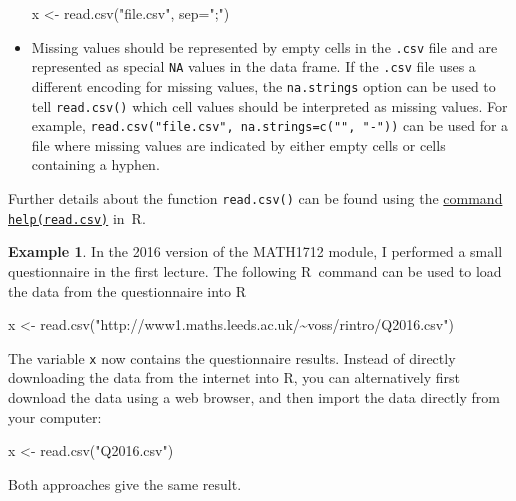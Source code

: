 \documentclass[
  a4paper,
]{article}
\newenvironment{Shaded}{\begin{snugshade}}{\end{snugshade}}
\newcommand{\AttributeTok}[1]{\textcolor[rgb]{0.77,0.63,0.00}{#1}}
\newcommand{\FunctionTok}[1]{\textcolor[rgb]{0.00,0.00,0.00}{#1}}
\newcommand{\NormalTok}[1]{#1}
\newcommand{\OtherTok}[1]{\textcolor[rgb]{0.56,0.35,0.01}{#1}}
\newcommand{\StringTok}[1]{\textcolor[rgb]{0.31,0.60,0.02}{#1}}
\theoremstyle{definition}
\theoremstyle{definition}
\newtheorem{example}{Example}[section]
\theoremstyle{definition}
\theoremstyle{definition}
\theoremstyle{remark}
\begin{document}
\begin{itemize}
\begin{Shaded}
\begin{Highlighting}[]
\NormalTok{  x }\OtherTok{\textless{}{-}} \FunctionTok{read.csv}\NormalTok{(}\StringTok{"file.csv"}\NormalTok{, }\AttributeTok{sep=}\StringTok{";"}\NormalTok{)}
\end{Highlighting}
\end{Shaded}
\item
  Missing values should be represented by empty cells in the \texttt{.csv}
  file and are represented as special \texttt{NA} values in the data frame.
  If the \texttt{.csv} file uses a different encoding for missing values,
  the \texttt{na.strings} option can be used to tell \texttt{read.csv()}
  which cell values should be interpreted as missing values. For example,
  \texttt{read.csv("file.csv",\ na.strings=c("",\ "-"))} can be used for a file
  where missing values are indicated by either empty cells or cells
  containing a hyphen.
\end{itemize}

Further details about the function \texttt{read.csv()} can be found using the
\href{https://rdrr.io/r/utils/read.table.html}{command \texttt{help(read.csv)}} in~R.

\begin{example}
\protect\hypertarget{exm:l1-poll-import}{}\label{exm:l1-poll-import}In the 2016 version of the MATH1712 module, I performed a small questionnaire
in the first lecture. The following R~command can be used to load the data
from the questionnaire into R

\begin{Shaded}
\begin{Highlighting}[]
\NormalTok{  x }\OtherTok{\textless{}{-}} \FunctionTok{read.csv}\NormalTok{(}\StringTok{"http://www1.maths.leeds.ac.uk/\textasciitilde{}voss/rintro/Q2016.csv"}\NormalTok{)}
\end{Highlighting}
\end{Shaded}

The variable \texttt{x} now contains the questionnaire results.
Instead of
directly downloading the data from the internet into R, you can
alternatively first download the data using a web browser, and then
import the data directly from your computer:

\begin{Shaded}
\begin{Highlighting}[]
\NormalTok{  x }\OtherTok{\textless{}{-}} \FunctionTok{read.csv}\NormalTok{(}\StringTok{"Q2016.csv"}\NormalTok{)}
\end{Highlighting}
\end{Shaded}

Both approaches give the same result.
\end{example}
\end{document}
